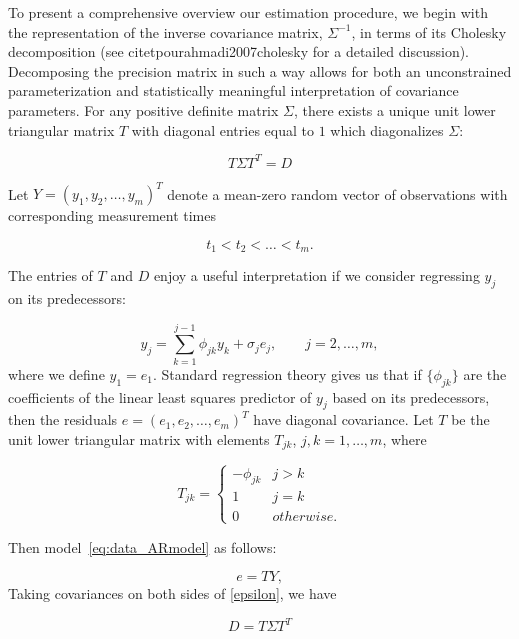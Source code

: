 \documentclass[12pt]{article}
\theoremstyle{definition}
\begin{document}
To present a comprehensive overview our estimation procedure, we begin with the representation of the inverse covariance matrix, $\Sigma^{-1}$, in terms of its Cholesky decomposition (see citet{pourahmadi2007cholesky} for a detailed discussion). Decomposing the precision matrix in such a way allows for both an unconstrained parameterization and statistically meaningful interpretation of covariance parameters. For any positive definite matrix $\Sigma$, there exists a unique unit lower triangular matrix $T$ with diagonal entries equal to $1$ which diagonalizes $\Sigma$:

\begin{equation}
\nonumber T \Sigma T^T = D
\end{equation}
\noindent

Let $Y = \left( y_{1}, y_{2}, \dots, y_{m} \right)^T$ denote a mean-zero random vector of observations with corresponding measurement times 

\[
t_{1} < t_{2} < \dots< t_{m}.
\]

The entries of $T$ and $D$ enjoy a useful interpretation if we consider regressing $y_{j}$ on its predecessors:

\begin{equation}
{y}_{j}  = \sum_{k=1}^{j-1} \phi_{jk} y_{k} + \sigma_{j}e_{j}, \qquad j=2,\dots,m, \label{eq:data_ARmodel}
\end{equation}
\noindent where we define $y_{1}=e_{1}$. Standard regression theory gives us that if $\lbrace \phi_{jk} \rbrace$ are the coefficients of the linear least squares predictor of $y_{j}$ based on its predecessors, then the residuals $e =\left( e_{1}, e_{2},\dots, e_{m} \right)^T$ have diagonal covariance. Let $T$ be the unit lower triangular matrix with elements $T_{jk}$, $j,k=1,\dots,m$, where

\[
T_{jk} = \left\{
\begin{array}{ll}
-\phi_{jk} & j > k\\
1 & j = k \\
0 & otherwise.
\end{array}\right.
\]

Then model~\ref{eq:data_ARmodel} as follows: 

\begin{equation}
e = T Y, \label{epsilon}
\end{equation}
\noindent
Taking covariances on both sides of \eqref{epsilon}, we have

\begin{equation}
\nonumber
D = T \Sigma T^T
\end{equation} 
\end{document}
